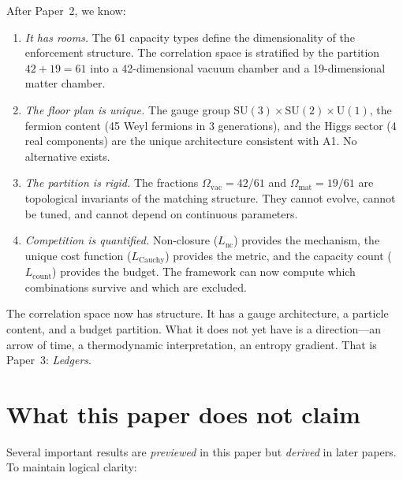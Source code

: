 \documentclass[11pt]{article}
\newcommand{\SU}{\mathrm{SU}}
\newcommand{\U}{\mathrm{U}}
\begin{document}
After Paper~2, we know:

\begin{enumerate}
\item \textit{It has rooms.}  The 61 capacity types define the dimensionality of the enforcement structure.  The correlation space is stratified by the partition $42 + 19 = 61$ into a 42-dimensional vacuum chamber and a 19-dimensional matter chamber.

\item \textit{The floor plan is unique.}  The gauge group $\SU(3) \times \SU(2) \times \U(1)$, the fermion content (45 Weyl fermions in 3 generations), and the Higgs sector (4 real components) are the unique architecture consistent with A1.  No alternative exists.

\item \textit{The partition is rigid.}  The fractions $\Omega_{\mathrm{vac}} = 42/61$ and $\Omega_{\mathrm{mat}} = 19/61$ are topological invariants of the matching structure.  They cannot evolve, cannot be tuned, and cannot depend on continuous parameters.

\item \textit{Competition is quantified.}  Non-closure ($L_{\mathrm{nc}}$) provides the mechanism, the unique cost function ($L_{\mathrm{Cauchy}}$) provides the metric, and the capacity count ($L_{\mathrm{count}}$) provides the budget.  The framework can now compute which combinations survive and which are excluded.
\end{enumerate}

The correlation space now has structure.  It has a gauge architecture, a particle content, and a budget partition.  What it does not yet have is a direction---an arrow of time, a thermodynamic interpretation, an entropy gradient.  That is Paper~3: \emph{Ledgers}.


\section{What this paper does not claim}
\label{sec:caveats}

Several important results are \emph{previewed} in this paper but \emph{derived} in later papers.  To maintain logical clarity:
\end{document}
